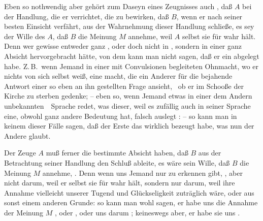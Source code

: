 \begin{aufza}
\begin{aufzb}
\begin{aufzc}
\item Eben so nothwendig aber gehört zum Daseyn eines Zeugnisses auch , daß $A$ bei der Handlung, die er verrichtet, die  zu bewirken, daß $B$, wenn er nach seiner besten Einsicht verfährt, aus der Wahrnehmung dieser Handlung schließe, es sey der Wille des $A$, daß $B$ die Meinung $M$ annehme, weil $A$ selbst sie für wahr hält. Denn wer gewisse  entweder ganz , oder doch nicht in , sondern in einer ganz  Absicht hervorgebracht hätte, von dem kann man nicht sagen, daß er ein  abgelegt habe. Z.\,B.\ wenn Jemand in einer mit Convulsionen begleiteten Ohnmacht, wo er nichts von sich selbst weiß, eine  macht, die ein Anderer für die bejahende Antwort einer so eben an ihn gestellten Frage ansieht, \zB\ ob er im Schooße der Kirche zu sterben gedenke; -- eben so, wenn Jemand etwas in einer dem Andern unbekannten~\ Sprache redet, was dieser, weil es zufällig auch in seiner Sprache eine, obwohl ganz andere Bedeutung hat, falsch auslegt \udgl : -- so kann man in keinem dieser Fälle sagen, daß der Erste das wirklich bezeugt habe, was nun der Andere glaubt.
\item Der Zeuge $A$ muß ferner die bestimmte Absicht haben, daß $B$ aus der Betrachtung seiner Handlung den Schluß ableite, es wäre sein Wille, daß $B$ die Meinung $M$ annehme, . Denn wenn uns Jemand nur zu erkennen gibt, , aber nicht darum, weil er selbst sie für wahr hält, sondern nur darum, weil ihre Annahme vielleicht unserer Tugend und Glückseligkeit zuträglich wäre, oder aus sonst einem anderen Grunde: so kann man wohl sagen, er habe uns die Annahme der Meinung $M$ , oder , oder uns darum ; keineswegs aber, er habe sie uns .

\end{aufzc}
\end{aufzb}
\end{aufza}
